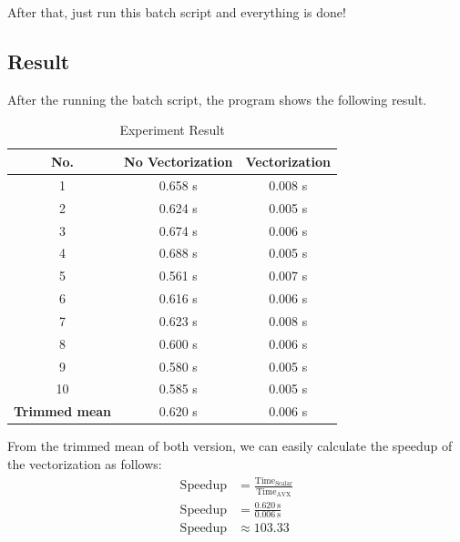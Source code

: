 \documentclass[12pt, a4paper]{article}
\begin{document}
            After that, just run this batch script and everything is done!

    \pagebreak

        \subsection{Result}
            After the running the batch script, the program shows the following result.

            \begin{table}[h]
                \centering
                \begin{tabular}{|c|c|c|}
                    \hline
                    \rule{0pt}{2.5ex}
                    \textbf{No.} & \textbf{No Vectorization} & \textbf{Vectorization} \\
                    \hline \hline
                    1 & 0.658 s & 0.008 s \\
                    2 & 0.624 s & 0.005 s \\
                    3 & 0.674 s & 0.006 s \\
                    4 & 0.688 s & 0.005 s \\
                    5 & 0.561 s & 0.007 s \\
                    6 & 0.616 s & 0.006 s \\
                    7 & 0.623 s & 0.008 s \\
                    8 & 0.600 s & 0.006 s \\
                    9 & 0.580 s & 0.005 s \\
                    10 & 0.585 s & 0.005 s \\
                    \hline \hline
                    \textbf{Trimmed mean} & 0.620 s & 0.006 s \\
                    \hline
                \end{tabular}
                \caption{Experiment Result}
            \end{table}

            From the trimmed mean of both version, we can easily calculate the speedup of the vectorization as follows:
            \begin{align*}
                \text{Speedup} &= \frac{{\text{Time}}_{\text{Scalar}}}{{\text{Time}}_{\text{AVX}}} \\[1em]
                \text{Speedup} &= \frac{0.620 \ \text{s}}{0.006 \ \text{s}} \\[1em]
                \text{Speedup} &\approx 103.33
            \end{align*}
\end{document}
